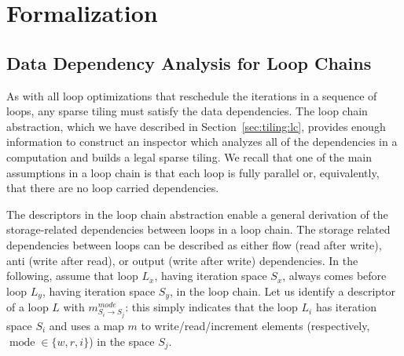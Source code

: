 

\section{Formalization}
\label{sec:tiling:algo}

\subsection{Data Dependency Analysis for Loop Chains}

As with all loop optimizations that reschedule the iterations in a sequence of loops, any sparse tiling must satisfy the data dependencies. The loop chain abstraction, which we have described in Section~\ref{sec:tiling:lc}, provides enough information to construct an inspector which analyzes all of the dependencies in a computation and builds a legal sparse tiling. We recall that one of the main assumptions in a loop chain is that each loop is fully parallel or, equivalently, that there are no loop carried dependencies.

The descriptors in the loop chain abstraction enable a general derivation of the storage-related dependencies between loops in a loop chain. The storage related dependencies between loops can be described as either flow (read after write), anti (write after read), or output (write after write) dependencies. In the following, assume that loop $L_x$, having iteration space $S_x$, always comes before loop $L_y$, having iteration space $S_y$, in the loop chain. Let us identify a descriptor of a loop $L$ with $m_{S_i \rightarrow S_j}^{mode}$: this simply indicates that the loop $L_i$ has iteration space $S_i$ and uses a map $m$ to write/read/increment elements (respectively, $\operatorname{mode} \in \lbrace w, r, i\rbrace$) in the space $S_j$.

